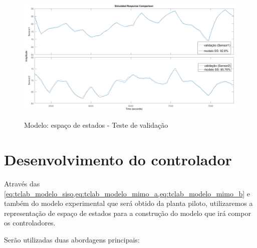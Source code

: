 \begin{figure}[h]
	\caption{Modelo: espaço de estados - Teste de validação}
	\begin{center}
		\includegraphics[width=1.00\textwidth]{./5_images/tclabsp-models-SS-compare.png} 
		\label{fig:tclabsp-models-ss-compare}
	\end{center}
	\centering
\end{figure}

\section{Desenvolvimento do controlador}
\label{sec:desenvolvimento_do_controlador}

Através das \cref{eq:tclab_modelo_siso,eq:tclab_modelo_mimo_a,eq:tclab_modelo_mimo_b}
e também do modelo experimental que será obtido da planta piloto, utilizaremos a representação de
espaço de estados para a construção do modelo que irá compor os controladores.

Serão utilizadas duas abordagens principais:

